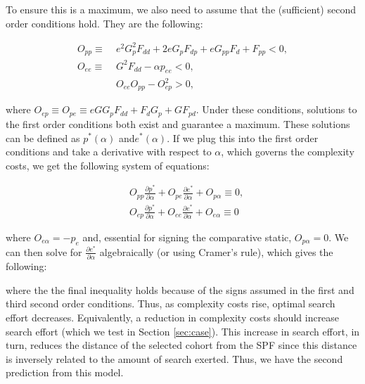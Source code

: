 To ensure this is a maximum, we also need to assume that the (sufficient) second order conditions hold. They are the following:

\begin{align}
O_{pp} \equiv &\;  e^2G_p^2F_{dd} + 2eG_pF_{dp} + eG_{pp}F_d + F_{pp} < 0, \nonumber \\
O_{ee}  \equiv &\;  G^2F_{dd} - \alpha p_{ee} < 0, \nonumber \\
&  \; O_{ee}O_{pp} - O_{ep}^2 > 0, \nonumber
\end{align}

\noindent where $O_{ep} \equiv O_{pe} \equiv eGG_pF_{dd} + F_dG_p + GF_{pd}$. Under these conditions, solutions to the first order conditions both exist and guarantee a maximum. These solutions can be defined as $p^*(\alpha)$ and$e^*(\alpha)$. If we plug this into the first order conditions and take a derivative with respect to $\alpha$, which governs the complexity costs, we get the following system of equations:

\begin{align}
& O_{pp}\frac{\partial p^*}{\partial \alpha} + O_{pe}\frac{\partial e^*}{\partial \alpha} + O_{p\alpha} \equiv 0, \nonumber \\
& O_{ep}\frac{\partial p^*}{\partial \alpha} + O_{ee}\frac{\partial e^*}{\partial \alpha} + O_{e\alpha} \equiv 0  \nonumber
\end{align}

\noindent where $O_{e\alpha} = -p_e$ and, essential for signing the comparative static, $O_{p\alpha} = 0$. We can then solve for $\frac{\partial e^*}{\partial \alpha}$ algebraically (or using Cramer's rule), which gives the following:


\noindent where the the final inequality holds because of the signs assumed in the first and third second order conditions.  Thus, as complexity costs rise, optimal search effort decreases. Equivalently, a reduction in complexity costs should increase search effort (which we test in Section \ref{sec:case}). This increase in search effort, in turn, reduces the distance of the selected cohort from the SPF since this distance is inversely related to the amount of search exerted. Thus, we have the second prediction from this model. \\

